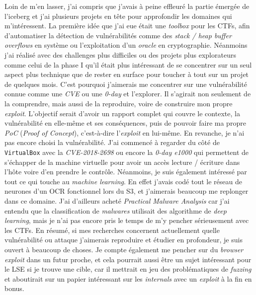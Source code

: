 \documentclass[a4paper, 11pt]{article}
\begin{document}
    Loin de m’en lasser, j’ai compris que j’avais à peine effleuré la partie émergée de l’iceberg et j’ai plusieurs projets en tête pour approfondir les domaines qui m’intéressent. La première idée que j’ai eue était une \emph{toolbox} pour les CTFs, afin d’automatiser la détection de vulnérabilités comme des \emph{stack / heap buffer overflows} en système ou l’exploitation d’un \emph{oracle} en cryptographie. Néanmoins j’ai réalisé avec des challenges plus difficiles ou des projets plus explorateurs comme celui de la phase I qu’il était plus intéressant de se concentrer sur un seul aspect plus technique que de rester en surface pour toucher à tout sur un projet de quelques mois. C’est pourquoi j’aimerais me concentrer sur une vulnérabilité connue comme une \emph{CVE} ou une \emph{0-day} et l’explorer. Il s’agirait non seulement de la comprendre, mais aussi de la reproduire, voire de construire mon propre \emph{exploit}. L’objectif serait d’avoir un rapport complet qui couvre le contexte, la vulnérabilité en elle-même et ses conséquences, puis de pouvoir faire ma propre \emph{PoC} (\emph{Proof of Concept}), c’est-à-dire l’\emph{exploit} en lui-même. En revanche, je n’ai pas encore choisi la vulnérabilité. J’ai commencé à regarder du côté de \texttt{VirtualBox} avec la \emph{CVE-2018-2698} ou encore la \emph{0-day e1000} qui permettent de s’échapper de la machine virtuelle pour avoir un accès lecture / écriture dans l’hôte voire d’en prendre le contrôle. Néanmoins, je suis également intéressé par tout ce qui touche au \emph{machine learning}. En effet j’avais codé tout le réseau de neurones d’un OCR fonctionnel lors du S3, et j’aimerais beaucoup me replonger dans ce domaine. J’ai d’ailleurs acheté \emph{Practical Malware Analysis} car j’ai entendu que la classification de \emph{malwares} utilisait des algorithme de \emph{deep learning}, mais je n’ai pas encore pris le temps de m’y pencher sérieusement avec les CTFs. En résumé, si mes recherches concernent actuellement quelle vulnérabilité ou attaque j’aimerais reproduire et étudier en profondeur, je suis ouvert à beaucoup de choses. Je compte également me pencher sur du \emph{browser exploit} dans un futur proche, et cela pourrait aussi être un sujet intéressant pour le LSE si je trouve une cible, car il mettrait en jeu des problématiques de \emph{fuzzing} et aboutirait sur un papier intéressant sur les \emph{internals} avec un \emph{exploit} à la fin en bonus.
\end{document}
